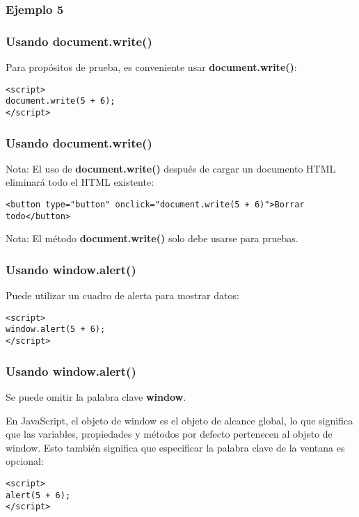 \begin{frame}[fragile]
  \frametitle{Ejemplo 5}
  
\end{frame}

\begin{frame}[fragile]
  \frametitle{Usando document.write()}

  Para propósitos de prueba, es conveniente usar
  \textbf{document.write()}: 

  \vspace{\baselineskip}
  \begin{lstlisting}
<script>
document.write(5 + 6);
</script>
  \end{lstlisting}
\end{frame}

\begin{frame}[fragile]
  \frametitle{Usando document.write()}

  \begin{alertblock}{Nota:}
    El uso de \textbf{document.write()} después de cargar un
    documento HTML eliminará todo el HTML existente:
  \end{alertblock}

  \vspace{\baselineskip}
  \begin{lstlisting}
<button type="button" onclick="document.write(5 + 6)">Borrar todo</button>
  \end{lstlisting}

  \begin{exampleblock}{Nota:}
    El método \textbf{document.write()} solo debe usarse para pruebas. 
  \end{exampleblock}
\end{frame}

\begin{frame}[fragile]
  \frametitle{Usando window.alert()}

  Puede utilizar un cuadro de alerta para mostrar datos:

  \vspace{\baselineskip}
  \begin{lstlisting}
<script>
window.alert(5 + 6);
</script>
  \end{lstlisting}
\end{frame}

\begin{frame}[fragile]
  \frametitle{Usando window.alert()}

  Se puede omitir la palabra clave \textbf{window}.

  \vspace{\baselineskip}
  En JavaScript, el objeto de window es el objeto de alcance global,
  lo que significa que las variables, propiedades y métodos por
  defecto pertenecen al objeto de window. Esto también significa que
  especificar la palabra clave de la ventana es opcional: 

  \vspace{\baselineskip}
  \begin{lstlisting}
<script>
alert(5 + 6);
</script>
  \end{lstlisting}
\end{frame}

